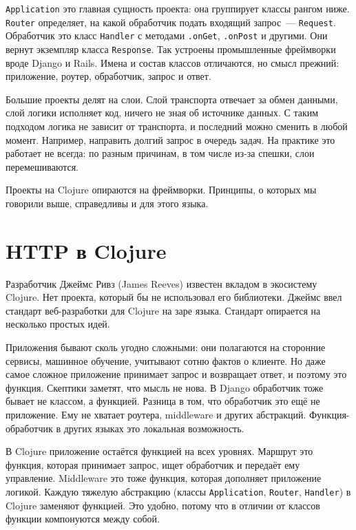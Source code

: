 \verb|Application| это главная сущность проекта: она группирует классы рангом
ниже. \verb|Router| определяет, на какой обработчик подать входящий запрос~---
\verb|Request|. Обработчик это класс \verb|Handler| с методами
\verb|.onGet|, \verb|.onPost| и другими. Они вернут экземпляр класса
\verb|Response|. Так устроены промышленные фреймворки вроде Django и
Rails. Имена и состав классов отличаются, но смысл прежний: приложение, роутер,
обработчик, запрос и ответ.


Большие проекты делят на слои. Слой транспорта отвечает за обмен данными, слой
логики исполняет код, ничего не зная об источнике данных. С таким подходом
логика не зависит от транспорта, и последний можно сменить в любой
момент. Например, направить долгий запрос в очередь задач. На практике это
работает не всегда: по разным причинам, в том числе из-за спешки, слои
перемешиваются.

Проекты на Clojure опираются на фреймворки. Принципы, о которых мы говорили
выше, справедливы и для этого языка.

\section{HTTP в Clojure}


Разработчик Джеймс Ривз (James Reeves)
известен вкладом в экосистему Clojure. Нет проекта, который бы не использовал
его библиотеки. Джеймс ввел стандарт веб-разработки для Clojure на заре
языка. Стандарт опирается на несколько простых идей.

Приложения бывают сколь угодно сложными: они полагаются на сторонние сервисы,
машинное обучение, учитывают сотню фактов о клиенте. Но даже самое сложное
приложение принимает запрос и возвращает ответ, и поэтому это функция. Скептики
заметят, что мысль не нова. В Django обработчик тоже бывает не классом, а
функцией. Разница в том, что обработчик это ещё не приложение. Ему не
хватает роутера, middleware и других абстракций. Функция-обработчик в других
языках это локальная возможность.

\label{http-all-function}

В Clojure приложение остаётся функцией на всех уровнях. Маршрут это функция,
которая принимает запрос, ищет обработчик и передаёт ему управление. Middleware
это тоже функция, которая дополняет приложение логикой. Каждую тяжелую
абстракцию (классы \verb|Application|, \verb|Router|, \verb|Handler|) в
Clojure заменяют функцией. Это удобно, потому что в отличии от классов функции
компонуются между собой.

